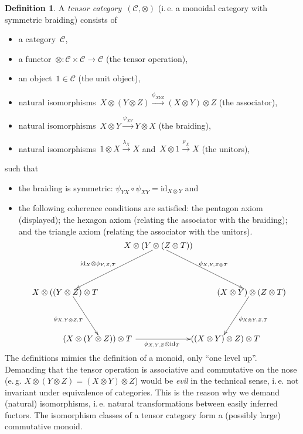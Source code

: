 \documentclass[a4paper,english,12pt]{scrartcl}
\theoremstyle{definition}
\newtheorem{defn}{Definition}[section]
\theoremstyle{plain}
\theoremstyle{remark}
\newcommand{\C}{\mathcal{C}}
\newcommand{\id}{\mathrm{id}}
\newcommand{\xra}[1]{\xrightarrow{#1}}
\renewcommand{\_}{\mathpunct{.}\,}
\newcommand{\?}{\,{:}\,}
\begin{document}
\begin{defn}A \emph{tensor category}~$(\C,\otimes)$ (i.\,e. a monoidal category with
symmetric braiding) consists of
\begin{itemize}
\item a category~$\C$,
\item a functor~${\otimes} : \C \times \C \to \C$ (the tensor operation),
\item an object~$1 \in \C$ (the unit object),
\item natural isomorphisms~$X \otimes (Y \otimes Z) \xra{\phi_{XYZ}} (X \otimes
Y) \otimes Z$ (the associator),
\item natural isomorphisms~$X \otimes Y \xra{\psi_{XY}} Y \otimes X$ (the
braiding),
\item natural isomorphisms~$1 \otimes X \xra{\lambda_X} X$ and~$X \otimes 1
\xra{\rho_X} X$ (the unitors),
\end{itemize}
such that
\begin{itemize}
\item the braiding is symmetric: $\psi_{YX} \circ \psi_{XY} = \id_{X \otimes
Y}$ and
\item the following coherence conditions are satisfied: the pentagon axiom
(displayed); the hexagon axiom (relating the associator with the braiding); and
the triangle axiom (relating the associator with the unitors).
\[ \xy
(0,20)*{X \otimes (Y \otimes (Z \otimes T))}="1"; 
(40,0)*{(X \otimes Y) \otimes (Z \otimes T)}="2"; 
(27,-20)*{\quad ((X \otimes Y) \otimes Z) \otimes T}="3"; 
(-27,-20)*{(X \otimes (Y \otimes Z)) \otimes T\!\!\!}="4"; 
(-40,0)*{X \otimes ((Y \otimes Z) \otimes T}="5"; 
{\ar^{\phi_{X,Y,Z \otimes T}} "1";"2"} 
{\ar^{\phi_{X\otimes Y,Z,T}} "2";"3"} 
{\ar_{\id_X \otimes \phi_{Y,Z,T}\quad} "1";"5"} 
{\ar_{\phi_{X,Y\otimes Z,T}} "5";"4"} 
{\ar_{\!\!\!\!\!\!\!\!\phi_{X,Y,Z} \otimes \id_T} "4";"3"} 
\endxy \]
\end{itemize}
\end{defn}

The definitions mimics the definition of a monoid, only ``one level up''.
Demanding that the tensor operation is associative and commutative on the nose
(e.\,g. $X \otimes (Y \otimes Z) = (X \otimes Y) \otimes Z$) would be
\emph{evil} in the technical sense, i.\,e. not invariant under equivalence of
categories. This is the reason why we demand (natural) isomorphisms, i.\,e.
natural transformations between easily inferred fuctors.
The isomorphism classes of a tensor category form a (possibly large) commutative monoid.
\end{document}
